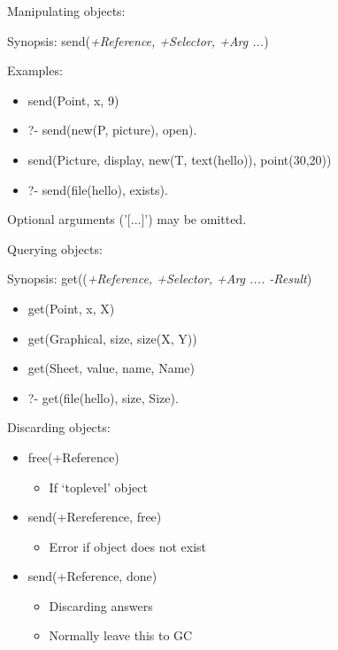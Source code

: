 \begin{sli}{Manipulating objects: }

Synopsis: send({\it +Reference, +Selector, +Arg ...})

Examples:

\begin{itemize}
    \item send(Point, x, 9)
    \item ?- send(new(P, picture), open).
    \item send(Picture, display, new(T, text(hello)), point(30,20))
    \item ?- send(file(hello), exists).
\end{itemize}

Optional arguments ('[...]') may be omitted.
\end{sli}

\begin{sli}{Querying objects: }

Synopsis: get(({\it +Reference, +Selector, +Arg .... -Result})

\begin{itemize}
    \item get(Point, x, X)
    \item get(Graphical, size, size(X, Y))
    \item get(Sheet, value, name, Name)
    \item ?- get(file(hello), size, Size).
\end{itemize}

\end{sli}

\begin{sli}{Discarding objects: }
\begin{itemize}
    \item free(+Reference)
    \begin{itemize}
        \item If `toplevel' object
    \end{itemize}
    \item send(+Rereference, free)
    \begin{itemize}
        \item Error if object does not exist
    \end{itemize}
    \item send(+Reference, done)
    \begin{itemize}
        \item Discarding answers
	\item Normally leave this to GC
    \end{itemize}
\end{itemize}
\end{sli}

